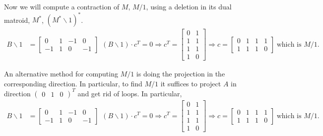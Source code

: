 \documentclass[a4paper, 10pt]{article}
\theoremstyle{definition} %
\begin{document}
Now we will compute a contraction of $M$, $M / 1$, using a deletion in its dual matroid, $M^*$, $(M^* \backslash 1)^*$.
\begin{equation*}
    \begin{split}
        B \backslash 1 & = \left[
            \begin{array}{cccc}
                0 & 1 & -1 & 0 \\
                -1 & 1 & 0 & -1 
            \end{array} 
        \right] \hspace{5pt}
        (B  \backslash 1)\cdot c^T = 0 \Rightarrow 
        c^T = \left[
                \begin{array}{cc}
                    0 & 1 \\
                    1 & 1 \\
                    1 & 1 \\
                    1 & 0
                \end{array} 
            \right] \Rightarrow
        c = \left[
                \begin{array}{cccc}
                    0 & 1 & 1 & 1 \\
                    1 & 1 & 1 & 0
                \end{array} 
            \right] \hspace{3pt} \text{which is $M / 1$.}
    \end{split}
\end{equation*}

An alternative method for computing $ M / 1$ is doing the projection in the corresponding direction. In particular, to find $ M / 1$ it suffices to project $A$ in direction $\left( \begin{array}{c} 0 & 1 & 0 \end{array} \right)^T$ and get rid of loops. In particular,
\begin{equation*}
    \begin{split}
        B \backslash 1 & = \left[
            \begin{array}{cccc}
                0 & 1 & -1 & 0 \\
                -1 & 1 & 0 & -1 
            \end{array} 
        \right] \hspace{5pt}
        (B  \backslash 1)\cdot c^T = 0 \Rightarrow 
        c^T = \left[
                \begin{array}{cc}
                    0 & 1 \\
                    1 & 1 \\
                    1 & 1 \\
                    1 & 0
                \end{array} 
            \right] \Rightarrow
        c = \left[
                \begin{array}{cccc}
                    0 & 1 & 1 & 1 \\
                    1 & 1 & 1 & 0
                \end{array} 
            \right] \hspace{3pt} \text{which is $M / 1$.}
    \end{split}
\end{equation*}
\end{document}
